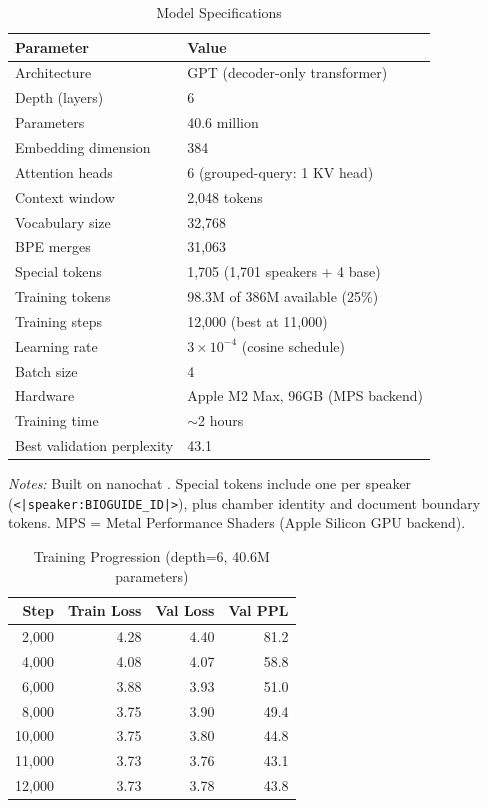 \documentclass[12pt]{article}
\begin{document}
\begin{table}[H]
\centering
\caption{Model Specifications}
\label{tab:model}
\begin{threeparttable}
\begin{tabular}{ll}
\toprule
Parameter & Value \\
\midrule
Architecture & GPT (decoder-only transformer) \\
Depth (layers) & 6 \\
Parameters & 40.6 million \\
Embedding dimension & 384 \\
Attention heads & 6 (grouped-query: 1 KV head) \\
Context window & 2,048 tokens \\
Vocabulary size & 32,768 \\
\quad BPE merges & 31,063 \\
\quad Special tokens & 1,705 (1,701 speakers + 4 base) \\
\midrule
Training tokens & 98.3M of 386M available (25\%) \\
Training steps & 12,000 (best at 11,000) \\
Learning rate & $3 \times 10^{-4}$ (cosine schedule) \\
Batch size & 4 \\
Hardware & Apple M2 Max, 96GB (MPS backend) \\
Training time & $\sim$2 hours \\
Best validation perplexity & 43.1 \\
\bottomrule
\end{tabular}
\begin{tablenotes}[flushleft]
\small
\item \textit{Notes:} Built on nanochat \citep{karpathy2025}. Special tokens include one per speaker (\texttt{<|speaker:BIOGUIDE\_ID|>}), plus chamber identity and document boundary tokens. MPS = Metal Performance Shaders (Apple Silicon GPU backend).
\end{tablenotes}
\end{threeparttable}
\end{table}

\begin{table}[H]
\centering
\caption{Training Progression (depth=6, 40.6M parameters)}
\label{tab:training}
\begin{tabular}{rrrr}
\toprule
Step & Train Loss & Val Loss & Val PPL \\
\midrule
2,000 & 4.28 & 4.40 & 81.2 \\
4,000 & 4.08 & 4.07 & 58.8 \\
6,000 & 3.88 & 3.93 & 51.0 \\
8,000 & 3.75 & 3.90 & 49.4 \\
10,000 & 3.75 & 3.80 & 44.8 \\
11,000 & 3.73 & 3.76 & 43.1 \\
12,000 & 3.73 & 3.78 & 43.8 \\
\bottomrule
\end{tabular}
\end{table}
\end{document}
